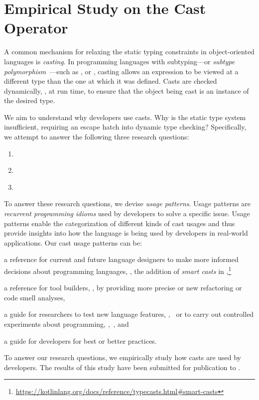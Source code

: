 \chapter{Empirical Study on the Cast Operator}
\label{cha:casts}

A common mechanism for relaxing the static typing constraints in object-oriented languages is \emph{casting}.
In programming languages with subtyping---or \emph{subtype polymorphism}~\citep{cardelliUnderstandingTypesData1985}---such as \java{}, \csharp{} or \cpp{},
casting allows an expression to be viewed at a different type than the one at which it was defined.
Casts are checked dynamically, \ie{}, at run time, to ensure that the object
being cast is an instance of the desired type.

We aim to understand why developers use casts.
Why is the static type system insufficient,
requiring an escape hatch into dynamic type checking?
Specifically, we attempt to answer the following three research questions:

\begin{enumerate}[label=$RQ/C\arabic*:$,ref=$RQ/C\arabic*$,leftmargin=3.4\parindent]
\item\label{casts:rq1}{\bf \crqA} \crqAdesc{}
\item\label{casts:rq2}{\bf \crqB} \crqBdesc{}
\item\label{casts:rq3}{\bf \crqC} \crqCdesc{}
\end{enumerate}

To answer these research questions, we devise
\emph{usage patterns}.
Usage patterns are \emph{recurrent programming idioms} used by developers to solve a specific issue.
Usage patterns enable the categorization of different kinds of cast usages and
thus provide insights into how the language is being used by developers in real-world applications.
Our cast usage patterns can be:
\begin{inparaenum}[(1)]
\item a reference for current and future language designers
to make more informed decisions about programming languages,
\eg{},
the addition of \emph{smart casts} in ,\footnote{\url{https://kotlinlang.org/docs/reference/typecasts.html\#smart-casts}}
\item a reference for tool builders, \eg{}, by providing more precise or new
  refactoring or code smell analyses,
\item a guide for researchers to test new language features, \eg{},~\cite{wintherGuardedTypePromotion2011} or to carry out controlled
  experiments about programming, \eg{},~\cite{stuchlikStaticVsDynamic2011}, and
\item a guide for developers for best or better practices.
\end{inparaenum}
To answer our research questions,
we empirically study how casts are used by developers.
The results of this study have been submitted for publication to .


